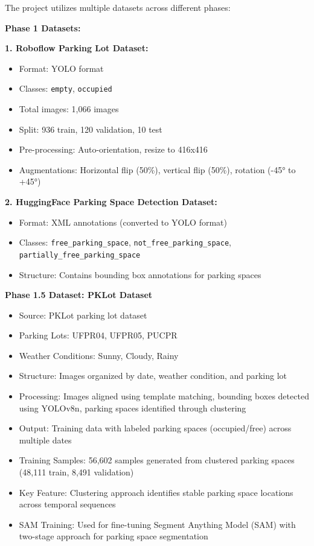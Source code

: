 \documentclass[12pt,a4paper]{article}
\begin{document}
The project utilizes multiple datasets across different phases:

\textbf{Phase 1 Datasets:}

\textbf{1. Roboflow Parking Lot Dataset:}
\begin{itemize}
    \item Format: YOLO format
    \item Classes: \texttt{empty}, \texttt{occupied}
    \item Total images: 1,066 images
    \item Split: 936 train, 120 validation, 10 test
    \item Pre-processing: Auto-orientation, resize to 416x416
    \item Augmentations: Horizontal flip (50\%), vertical flip (50\%), rotation (-45° to +45°)
\end{itemize}

\textbf{2. HuggingFace Parking Space Detection Dataset:}
\begin{itemize}
    \item Format: XML annotations (converted to YOLO format)
    \item Classes: \texttt{free\_parking\_space}, \texttt{not\_free\_parking\_space}, \texttt{partially\_free\_parking\_space}
    \item Structure: Contains bounding box annotations for parking spaces
\end{itemize}

\textbf{Phase 1.5 Dataset: PKLot Dataset}
\begin{itemize}
    \item Source: PKLot parking lot dataset
    \item Parking Lots: UFPR04, UFPR05, PUCPR
    \item Weather Conditions: Sunny, Cloudy, Rainy
    \item Structure: Images organized by date, weather condition, and parking lot
    \item Processing: Images aligned using template matching, bounding boxes detected using YOLOv8n, parking spaces identified through clustering
    \item Output: Training data with labeled parking spaces (occupied/free) across multiple dates
    \item Training Samples: 56,602 samples generated from clustered parking spaces (48,111 train, 8,491 validation)
    \item Key Feature: Clustering approach identifies stable parking space locations across temporal sequences
    \item SAM Training: Used for fine-tuning Segment Anything Model (SAM) with two-stage approach for parking space segmentation
\end{itemize}
\end{document}
